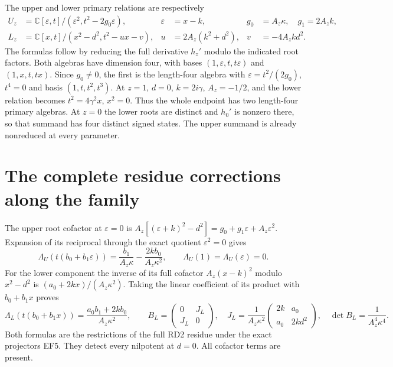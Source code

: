 The upper and lower primary relations are respectively
\begin{equation}
\begin{aligned}
 U_z&=\mathbb C[\varepsilon,t]/(\varepsilon^2,t^2-2g_0\varepsilon),
 &\varepsilon&=x-k,&g_0&=A_z\kappa,\quad g_1=2A_zk,\\
 L_z&=\mathbb C[x,t]/(x^2-d^2,t^2-u x-v),
 &u&=2A_z(k^2+d^2),&v&=-4A_zkd^2.
\end{aligned}\tag{EF9}
\end{equation}
The formulas follow by reducing the full derivative
$h_z'$ modulo the indicated root factors. Both algebras
have dimension four, with bases $(1,\varepsilon,t,t\varepsilon)$
and $(1,x,t,tx)$. Since $g_0\ne0$, the first is the
length-four algebra with $\varepsilon=t^2/(2g_0)$,
$t^4=0$ and basis $(1,t,t^2,t^3)$.
At $z=1$, $d=0$, $k=2i\gamma$, $A_z=-1/2$,
and the lower relation becomes $t^2=4\gamma^2x$,
$x^2=0$. Thus the whole endpoint has two length-four
primary algebras. At $z=0$ the lower roots are
distinct and $h_0'$ is nonzero there, so that summand
has four distinct signed states. The upper summand is
already nonreduced at every parameter.

\section{The complete residue corrections along the family}
The upper root cofactor at $\varepsilon=0$ is
$A_z[(\varepsilon+k)^2-d^2]=g_0+g_1\varepsilon+A_z\varepsilon^2$.
Expansion of its reciprocal through the exact quotient
$\varepsilon^2=0$ gives
\begin{equation}
 \Lambda_U(t(b_0+b_1\varepsilon))
   =\frac{b_1}{A_z\kappa}-\frac{2k b_0}{A_z\kappa^2},\qquad
 \Lambda_U(1)=\Lambda_U(\varepsilon)=0.
 \tag{EF10}
\end{equation}
For the lower component the inverse of its full cofactor
$A_z(x-k)^2$ modulo $x^2-d^2$ is
$(a_0+2kx)/(A_z\kappa^2)$. Taking the linear coefficient
of its product with $b_0+b_1x$ proves
\begin{equation}
 \Lambda_L(t(b_0+b_1x))
   =\frac{a_0b_1+2kb_0}{A_z\kappa^2},\qquad
 B_L=\begin{pmatrix}0&J_L\\J_L&0\end{pmatrix},\quad
 J_L=\frac1{A_z\kappa^2}
       \begin{pmatrix}2k&a_0\\a_0&2kd^2\end{pmatrix},\quad
 \det B_L=\frac1{A_z^4\kappa^4}.
 \tag{EF11}
\end{equation}
Both formulas are the restrictions of the full RD2
residue under the exact projectors EF5. They detect
every nilpotent at $d=0$. All cofactor terms are present.

